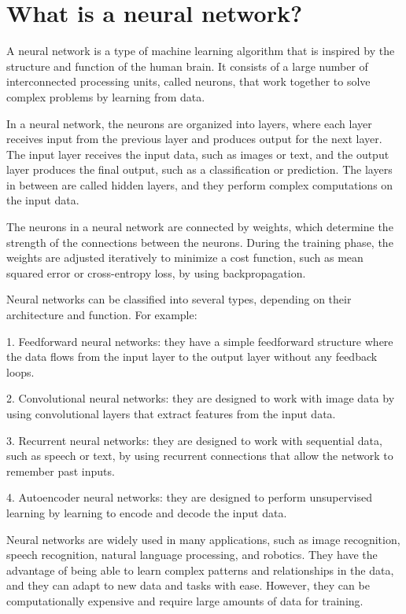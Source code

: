 \section{What is a neural network?}
A neural network is a type of machine learning algorithm that is inspired by the structure and function of the human brain. It consists of a large number of interconnected processing units, called neurons, that work together to solve complex problems by learning from data.

In a neural network, the neurons are organized into layers, where each layer receives input from the previous layer and produces output for the next layer. The input layer receives the input data, such as images or text, and the output layer produces the final output, such as a classification or prediction. The layers in between are called hidden layers, and they perform complex computations on the input data.

The neurons in a neural network are connected by weights, which determine the strength of the connections between the neurons. During the training phase, the weights are adjusted iteratively to minimize a cost function, such as mean squared error or cross-entropy loss, by using backpropagation.

Neural networks can be classified into several types, depending on their architecture and function. For example:

1. Feedforward neural networks: they have a simple feedforward structure where the data flows from the input layer to the output layer without any feedback loops.

2. Convolutional neural networks: they are designed to work with image data by using convolutional layers that extract features from the input data.

3. Recurrent neural networks: they are designed to work with sequential data, such as speech or text, by using recurrent connections that allow the network to remember past inputs.

4. Autoencoder neural networks: they are designed to perform unsupervised learning by learning to encode and decode the input data.

Neural networks are widely used in many applications, such as image recognition, speech recognition, natural language processing, and robotics. They have the advantage of being able to learn complex patterns and relationships in the data, and they can adapt to new data and tasks with ease. However, they can be computationally expensive and require large amounts of data for training.

